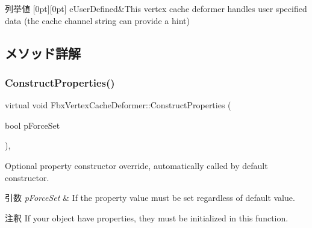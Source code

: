 \begin{DoxyEnumFields}{列挙値}
[0pt][0pt]{}\mbox{\label{class_fbx_vertex_cache_deformer_a24f0c46d4f47717615852a8e7346efedafdf33d4ddb69c7cc595986665c3eab27}} 
e\+User\+Defined&This vertex cache deformer handles user specified data (the cache channel string can provide a hint) \\
\hline

\end{DoxyEnumFields}


\subsection{メソッド詳解}
\mbox{\label{class_fbx_vertex_cache_deformer_aed14ffc10416f556b602b87e8d8d6926}} 
\subsubsection{\texorpdfstring{Construct\+Properties()}{ConstructProperties()}}
{\footnotesize\ttfamily virtual void Fbx\+Vertex\+Cache\+Deformer\+::\+Construct\+Properties (\begin{DoxyParamCaption}\item[{bool}]{p\+Force\+Set }\end{DoxyParamCaption})\hspace{0.3cm}{\ttfamily [protected]}, {\ttfamily [virtual]}}

Optional property constructor override, automatically called by default constructor. 
\begin{DoxyParams}{引数}
{\em p\+Force\+Set} & If the property value must be set regardless of default value. \\
\hline
\end{DoxyParams}
\begin{DoxyRemark}{注釈}
If your object have properties, they must be initialized in this function. 
\end{DoxyRemark}


